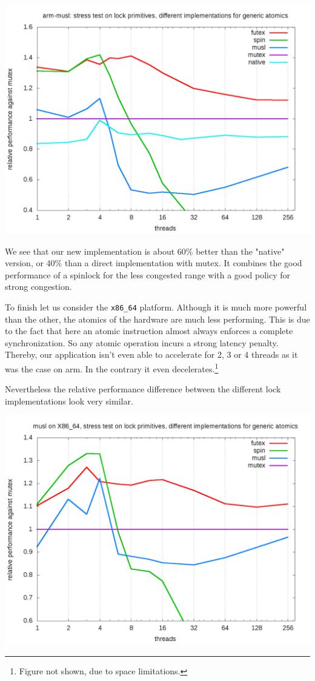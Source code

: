 \documentclass{sig-alternate-05-2015}
\begin{document}
\begin{center}
\includegraphics[width=0.95\linewidth]{benchs/arm/test-arm-u64-relative.png}
\end{center}

We see that our new implementation is about 60\% better than
the "native" version, or 40\% than a direct implementation with
mutex. It combines the good performance of a spinlock for the less
congested range with a good policy for strong congestion.

To finish let us consider the \texttt{x86\_64} platform. Although it
is much more powerful than the other, the atomics of the hardware
are much less performing. This is due to the fact that here an
atomic instruction almost always enforces a complete
synchronization. So any atomic operation incurs a strong latency
penalty. Thereby, our application isn't even able to accelerate for
2, 3 or 4 threads as it was the case on arm. In the contrary it
even decelerates.\footnote{Figure not shown, due to space limitations.}

Nevertheless the relative performance difference between the
different lock implementations look very similar.

\begin{center}
\includegraphics[width=0.95\linewidth]{benchs/x86_64/test-x86_64-musl-relative.png}
\end{center}
\end{document}
